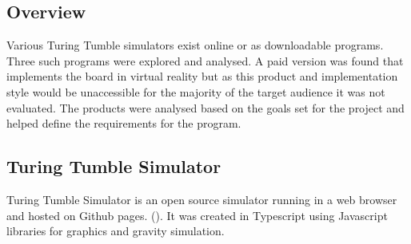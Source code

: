 \documentclass{l4proj}
\begin{document}
\subsection{Overview}
Various Turing Tumble simulators exist online or as downloadable programs. Three such programs were explored and analysed. A paid version was found that implements the board in virtual reality but as this product and implementation style would be unaccessible for the majority of the target audience it was not evaluated. The products were analysed based on the goals set for the project and helped define the requirements for the program.

\subsection{Turing Tumble Simulator}
Turing Tumble Simulator is an open source simulator running in a web browser and hosted on Github pages. (\cite{turing_tumble_simulator}). It was created in Typescript using Javascript libraries for graphics and gravity simulation. 
\end{document}
